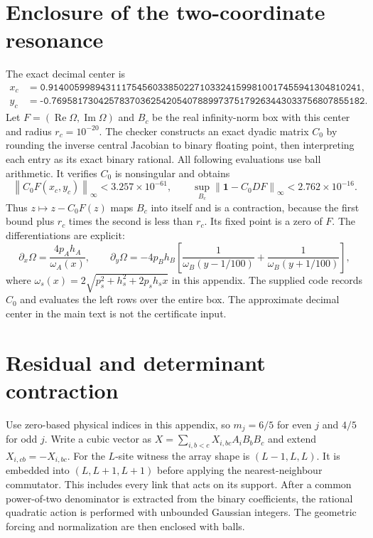 \documentclass[11pt,a4paper]{article}
\newcommand{\Id}{\mathbf{1}}
\newcommand{\Rea}{\operatorname{Re}}
\newcommand{\Ima}{\operatorname{Im}}
\newcommand{\norm}[1]{\left\lVert#1\right\rVert}
\begin{document}
\section{Enclosure of the two-coordinate resonance}\label{app:root}
The exact decimal center is
\begin{align*}
 x_c&=\texttt{0.914005998943111754560338502271033241599810017455941304810241},\\
 y_c&=\texttt{-0.769581730425783703625420540788997375179263443033756807855182}.
\end{align*}
Let $F=(\Rea\Omega,\Ima\Omega)$ and $B_c$ be the real infinity-norm
box with this center and radius $r_c=10^{-20}$. The checker constructs an
exact dyadic matrix $C_0$ by rounding the inverse central Jacobian to binary
floating point, then interpreting each entry as its exact binary rational.
All following evaluations use ball arithmetic. It verifies $C_0$ is
nonsingular and obtains
\begin{equation}
 \norm{C_0F(x_c,y_c)}_\infty<3.257\times10^{-61},\qquad
 \sup_{B_c}\norm{\Id-C_0DF}_\infty<2.762\times10^{-16}.\label{eq:rootbounds}
\end{equation}
Thus $z\mapsto z-C_0F(z)$ maps $B_c$ into itself and is a contraction,
because the first bound plus $r_c$ times the second is less than $r_c$.
Its fixed point is a zero of $F$. The differentiations are explicit:
\begin{equation}
 \partial_x\Omega=\frac{4p_Ah_A}{\omega_A(x)},\qquad
 \partial_y\Omega=-4p_Bh_B\left[
       \frac1{\omega_B(y-1/100)}+\frac1{\omega_B(y+1/100)}\right],
\end{equation}
where $\omega_s(x)=2\sqrt{p_s^2+h_s^2+2p_sh_sx}$ in this appendix.
The supplied code records $C_0$ and evaluates the left rows over the entire
box. The approximate decimal center in the main text is not the certificate
input.

\section{Residual and determinant contraction}\label{app:residual}
Use zero-based physical indices in this appendix, so
$m_j=6/5$ for even $j$ and $4/5$ for odd $j$.
Write a cubic vector as $X=\sum_{i,b<c}X_{i,bc}A_iB_bB_c$ and extend
$X_{i,cb}=-X_{i,bc}$. For the $L$-site witness the array shape is
$(L-1,L,L)$. It is embedded into $(L,L+1,L+1)$ before applying the
nearest-neighbour commutator. This includes every link that acts on its
support. After a common power-of-two denominator is extracted from the
binary coefficients, the rational quadratic action is performed with
unbounded Gaussian integers. The geometric forcing and normalization are
then enclosed with balls.
\end{document}
